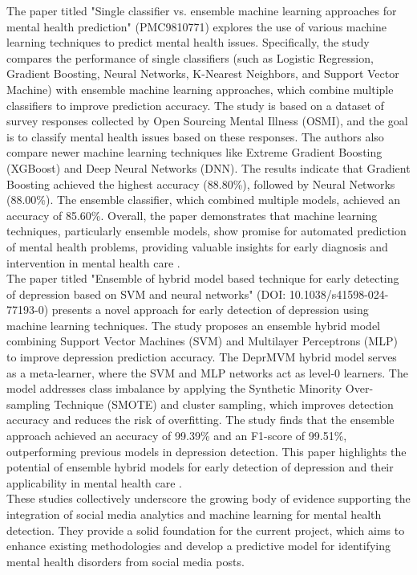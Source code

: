 \noindent
The paper titled "Single classifier vs. ensemble machine learning approaches for mental health prediction" (PMC9810771) explores the use of various machine learning techniques to predict mental health issues. Specifically, the study compares the performance of single classifiers (such as Logistic Regression, Gradient Boosting, Neural Networks, K-Nearest Neighbors, and Support Vector Machine) with ensemble machine learning approaches, which combine multiple classifiers to improve prediction accuracy. The study is based on a dataset of survey responses collected by Open Sourcing Mental Illness (OSMI), and the goal is to classify mental health issues based on these responses. The authors also compare newer machine learning techniques like Extreme Gradient Boosting (XGBoost) and Deep Neural Networks (DNN). The results indicate that Gradient Boosting achieved the highest accuracy (88.80\%), followed by Neural Networks (88.00\%). The ensemble classifier, which combined multiple models, achieved an accuracy of 85.60\%. Overall, the paper demonstrates that machine learning techniques, particularly ensemble models, show promise for automated prediction of mental health problems, providing valuable insights for early diagnosis and intervention in mental health care \cite{Chung_2023}. \\


\noindent
The paper titled "Ensemble of hybrid model based technique for early detecting of depression based on SVM and neural networks" (DOI: 10.1038/s41598-024-77193-0) presents a novel approach for early detection of depression using machine learning techniques. The study proposes an ensemble hybrid model combining Support Vector Machines (SVM) and Multilayer Perceptrons (MLP) to improve depression prediction accuracy. The DeprMVM hybrid model serves as a meta-learner, where the SVM and MLP networks act as level-0 learners. The model addresses class imbalance by applying the Synthetic Minority Over-sampling Technique (SMOTE) and cluster sampling, which improves detection accuracy and reduces the risk of overfitting. The study finds that the ensemble approach achieved an accuracy of 99.39\% and an F1-score of 99.51\%, outperforming previous models in depression detection. This paper highlights the potential of ensemble hybrid models for early detection of depression and their applicability in mental health care \cite{Saha2024}. \\


\noindent
These studies collectively underscore the growing body of evidence supporting the integration of social media analytics and machine learning for mental health detection. They provide a solid foundation for the current project, which aims to enhance existing methodologies and develop a predictive model for identifying mental health disorders from social media posts.

